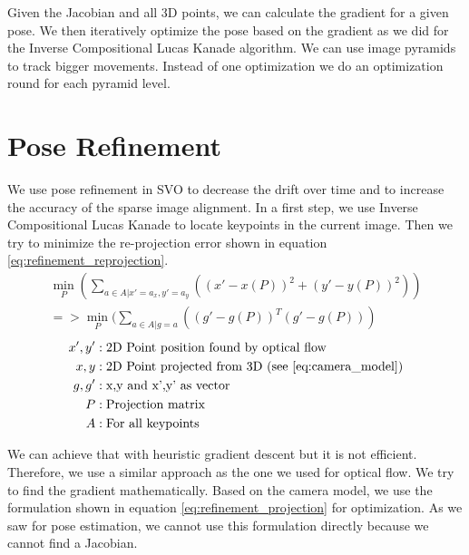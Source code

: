 \documentclass[11pt,a4paper,titlepage,oneside]{report}
\begin{document}
Given the Jacobian and all 3D points, we can calculate the gradient for a given pose. We then iteratively optimize the pose based on the gradient as we did for the Inverse Compositional Lucas Kanade algorithm. We can use image pyramids to track bigger movements. Instead of one optimization we do an optimization round for each pyramid level.

\chapter{Pose Refinement}\label{ch:pose_refinement}

We use pose refinement in SVO to decrease the drift over time and to increase the accuracy of the sparse image alignment. In a first step, we use Inverse Compositional Lucas Kanade to locate keypoints in the current image. Then we try to minimize the re-projection error shown in equation \ref{eq:refinement_reprojection}.
\begin{equation}\label{eq:refinement_reprojection}
  \begin{gathered}
    \min_P(\sum_{a \in A|x'=a_x,y'=a_y}((x'-x(P))^2+(y'-y(P))^2))\\
    =>\min_P(\sum_{a \in A|g=a}((g'-g(P))^T(g'-g(P)))
  \end{gathered}
\end{equation}
\begin{align*}
  x',y'   &: \text{2D Point position found by optical flow}\\
  x,y     &: \text{2D Point projected from 3D (see \ref{eq:camera_model})}\\
  g,g'    &: \text{x,y and x',y' as vector}\\
  P       &: \text{Projection matrix}\\
  A       &: \text{For all keypoints}\\
\end{align*}

We can achieve that with heuristic gradient descent but it is not efficient. Therefore, we use a similar approach as the one we used for optical flow. We try to find the gradient mathematically. Based on the camera model, we use the formulation shown in equation \ref{eq:refinement_projection} for optimization. As we saw for pose estimation, we cannot use this formulation directly because we cannot find a Jacobian.
\end{document}
